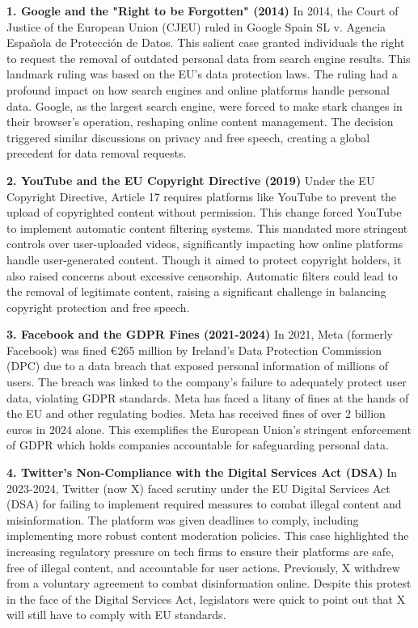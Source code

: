 \textbf{1. Google and the "Right to be Forgotten" (2014)}
In 2014, the Court of Justice of the European Union (CJEU) ruled in Google Spain SL v. Agencia Española de Protección de Datos. This salient case granted individuals the right to request the removal of outdated personal data from search engine results. \cite{google2014} This landmark ruling was based on the EU's data protection laws. The ruling had a profound impact on how search engines and online platforms handle personal data. Google, as the largest search engine, were forced to make stark changes in their browser's operation, reshaping online content management. The decision triggered similar discussions on privacy and free speech, creating a global precedent for data removal requests.

\textbf{2. YouTube and the EU Copyright Directive (2019)}
Under the EU Copyright Directive, Article 17 requires platforms like YouTube to prevent the upload of copyrighted content without permission. \cite{eu2019} This change forced YouTube to implement automatic content filtering systems. This mandated more stringent controls over user-uploaded videos, significantly impacting how online platforms handle user-generated content. Though it aimed to protect copyright holders, it also raised concerns about excessive censorship. Automatic filters could lead to the removal of legitimate content, raising a significant challenge in balancing copyright protection and free speech.

\textbf{3. Facebook and the GDPR Fines (2021-2024)}
In 2021, Meta (formerly Facebook) was fined €265 million by Ireland's Data Protection Commission (DPC) due to a data breach that exposed personal information of millions of users. \cite{facebook2023} The breach was linked to the company's failure to adequately protect user data, violating GDPR standards. Meta has faced a litany of fines at the hands of the EU and other regulating bodies. Meta has received fines of over 2 billion euros in 2024 alone. \cite{FBFines} This exemplifies the European Union's stringent enforcement of GDPR which holds companies accountable for safeguarding personal data. 

\textbf{4. Twitter's Non-Compliance with the Digital Services Act (DSA)}
In 2023-2024, Twitter (now X) faced scrutiny under the EU Digital Services Act (DSA) for failing to implement required measures to combat illegal content and misinformation. \cite{twitter2023} The platform was given deadlines to comply, including implementing more robust content moderation policies. This case highlighted the increasing regulatory pressure on tech firms to ensure their platforms are safe, free of illegal content, and accountable for user actions. Previously, X withdrew from a voluntary agreement to combat disinformation online. Despite this protest in the face of the Digital Services Act, legislators were quick to point out that X will still have to comply with EU standards. \cite{bhr2023}

